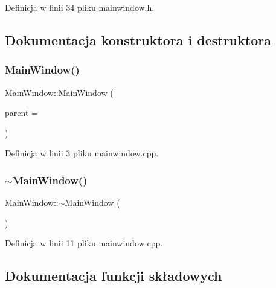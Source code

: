 Definicja w linii 34 pliku mainwindow.\+h.



\subsection{Dokumentacja konstruktora i destruktora}
\mbox{\label{class_main_window_a8b244be8b7b7db1b08de2a2acb9409db}} 
\subsubsection{\texorpdfstring{Main\+Window()}{MainWindow()}}
{\footnotesize\ttfamily Main\+Window\+::\+Main\+Window (\begin{DoxyParamCaption}\item[{Q\+Widget $\ast$}]{parent = {} }\end{DoxyParamCaption})\hspace{0.3cm}{\ttfamily [explicit]}}



Definicja w linii 3 pliku mainwindow.\+cpp.

\mbox{\label{class_main_window_ae98d00a93bc118200eeef9f9bba1dba7}} 
\subsubsection{\texorpdfstring{$\sim$\+Main\+Window()}{~MainWindow()}}
{\footnotesize\ttfamily Main\+Window\+::$\sim$\+Main\+Window (\begin{DoxyParamCaption}{ }\end{DoxyParamCaption})}



Definicja w linii 11 pliku mainwindow.\+cpp.



\subsection{Dokumentacja funkcji składowych}
\mbox{\label{class_main_window_ad1878f043e440b2917d12ed59caaca0c}} 
